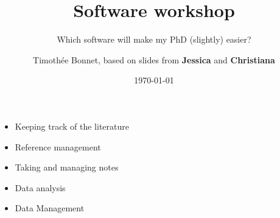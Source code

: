 \documentclass[10pt]{beamer}%
\title[Software workshop]{Software workshop}
\subtitle{Which software will make my PhD (slightly) easier?}
\date{\today}
\author[EE PhD retreat 2019]{Timoth\'ee Bonnet, based on slides from \textbf{Jessica} and \textbf{Christiana}}
\begin{document}
\begin{frame}
\maketitle
\end{frame}

\begin{frame}{}
    \begin{itemize}
    \item Keeping track of the literature
    \item Reference management
    \item Taking and managing notes
    \item Data analysis
    \item Data Management
        \end{itemize}

\end{frame}

\begin{frame}{}
\end{frame}
\end{document}
